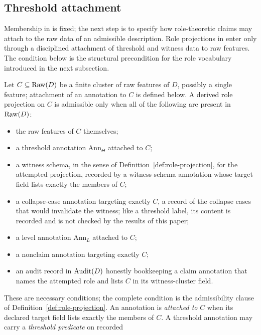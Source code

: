 \subsection{Threshold attachment}\label{subsec:threshold-attachment}

Membership in \FATCD{} is fixed; the next step is to specify how
role-theoretic claims may attach to the raw data of an admissible
description. Role projections in \FATCD{} enter only through a
disciplined attachment of threshold and witness data to raw features.
The condition below is the structural precondition for the role
vocabulary introduced in the next subsection.

\begin{definition}\label{def:threshold-attachment}
Let \(C\subseteq\operatorname{Raw}\!\left(D\right)\) be a finite cluster of raw features of \(D\), possibly
a single feature; attachment of an annotation to \(C\) is defined below. A derived role projection on \(C\) is
admissible only when all of the following are present in \(\operatorname{Raw}\!\left(D\right)\):
\begin{itemize}[topsep=2pt,itemsep=1pt]
  \item the raw features of \(C\) themselves;
  \item a threshold annotation \(\mathrm{Ann}_\Theta\) attached to \(C\);
  \item a witness schema, in the sense of
    Definition~\ref{def:role-projection}, for the attempted projection, recorded by a witness-schema annotation whose target field lists exactly the members of \(C\);
  \item a collapse-case annotation targeting exactly \(C\), a record of the collapse
    cases that would invalidate the witness; like a threshold label, its
    content is recorded and is not checked by the results of this paper;
  \item a level annotation \(\mathrm{Ann}_L\) attached to \(C\);
  \item a nonclaim annotation targeting exactly \(C\);
  \item an audit record in \(\operatorname{Audit}\!\left(D\right)\) honestly bookkeeping a claim annotation
    that names the attempted role and lists \(C\) in its witness-cluster field.
\end{itemize}
These are necessary conditions; the complete condition is the admissibility
clause of Definition~\ref{def:role-projection}.
An annotation is \emph{attached to} \(C\) when its declared target field
lists exactly the members of \(C\). A threshold annotation may carry a \emph{threshold predicate} on recorded

\end{definition}
